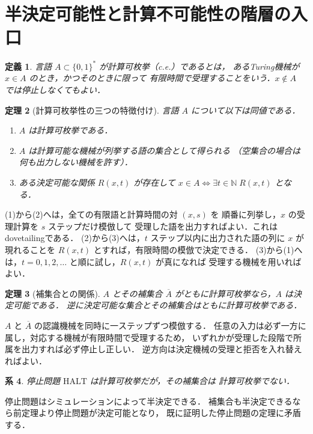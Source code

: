 \documentclass[a5paper,10pt,onecolumn]{jsarticle}
\makeatletter
\theoremstyle{mathnotetheorem}
\newtheorem{theorem}{定理}[section]
\newtheorem{definition}[theorem]{定義}
\newtheorem{corollary}[theorem]{系}
\renewcommand{\proofname}{証明}
\renewenvironment{proof}[1][\proofname]{%
  \par\pushQED{\qed}\normalfont\topsep4\p@\@plus2\p@\relax
  \trivlist\item[\hskip\labelsep\bfseries #1]\ignorespaces
}{\popQED\endtrivlist\@endpefalse}
\makeatother
\begin{document}
\section{半決定可能性と計算不可能性の階層の入口}
\begin{definition}
言語 $A\subset\{0,1\}^*$ が計算可枚挙（c.e.）であるとは，
あるTuring機械が $x\in A$ のとき，かつそのときに限って
有限時間で受理することをいう．$x\notin A$ では停止しなくてもよい．
\end{definition}
\begin{theorem}[計算可枚挙性の三つの特徴付け]
言語 $A$ について以下は同値である．
\begin{enumerate}
\item $A$ は計算可枚挙である．
\item $A$ は計算可能な機械が列挙する語の集合として得られる
（空集合の場合は何も出力しない機械を許す）．
\item ある決定可能な関係 $R(x,t)$ が存在して
$x\in A\iff\exists t\in\mathbb N\;R(x,t)$ となる．
\end{enumerate}
\end{theorem}
\begin{proof}
(1)から(2)へは，全ての有限語と計算時間の対 $(x,s)$ を
順番に列挙し，$x$ の受理計算を $s$ ステップだけ模倣して
受理した語を出力すればよい．これはdovetailingである．
(2)から(3)へは，$t$ ステップ以内に出力された語の列に
$x$ が現れることを $R(x,t)$ とすれば，有限時間の模倣で決定できる．
(3)から(1)へは，$t=0,1,2,\ldots$ と順に試し，$R(x,t)$ が真になれば
受理する機械を用いればよい．
\end{proof}
\begin{theorem}[補集合との関係]
$A$ とその補集合 $\overline A$ がともに計算可枚挙なら，$A$ は決定可能である．
逆に決定可能な集合とその補集合はともに計算可枚挙である．
\end{theorem}
\begin{proof}
$A$ と $\overline A$ の認識機械を同時に一ステップずつ模倣する．
任意の入力は必ず一方に属し，対応する機械が有限時間で受理するため，
いずれかが受理した段階で所属を出力すれば必ず停止し正しい．
逆方向は決定機械の受理と拒否を入れ替えればよい．
\end{proof}
\begin{corollary}
停止問題 $\mathrm{HALT}$ は計算可枚挙だが，その補集合は
計算可枚挙でない．
\end{corollary}
\begin{proof}
停止問題はシミュレーションによって半決定できる．
補集合も半決定できるなら前定理より停止問題が決定可能となり，
既に証明した停止問題の定理に矛盾する．
\end{proof}
\end{document}
